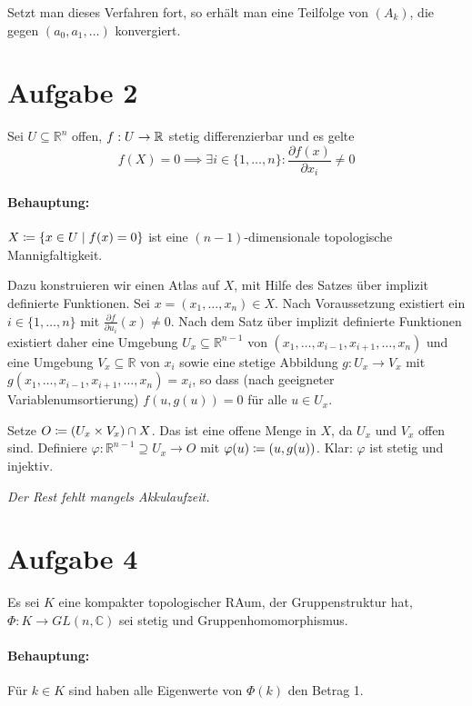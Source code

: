 \documentclass{article}
\begin{document}
Setzt man dieses Verfahren fort, so erhält man eine Teilfolge von $(A_k)$, die gegen $(a_0,a_1,\ldots)$ konvergiert.

\section*{Aufgabe 2}

Sei $U\subseteq \mathbb R^n$ offen, $f:U\to \mathbb{R}$ stetig differenzierbar und es gelte 
\[
f(X)= 0 \implies \exists i\in \{1,\ldots,n\}: \frac{\partial f(x)}{\partial x_i} \ne 0
\]

\paragraph{Behauptung:} $X\mathrel{\mbox{$\coloneqq$}} \{x\in U\mid f(x)=0\}$ ist eine $(n-1)$-dimensionale topologische Mannigfaltigkeit.

Dazu konstruieren wir einen Atlas auf $X$, mit Hilfe des Satzes über implizit definierte Funktionen. Sei $x=(x_1,\ldots,x_n)\in X$. Nach Voraussetzung existiert ein $i\in\{1,\ldots,n\}$ mit $\frac{\partial f}{\partial u_i}(x) \ne 0$. Nach dem Satz über implizit definierte Funktionen existiert daher eine Umgebung $U_x\subseteq \mathbb R^{n-1}$ von $(x_1,\ldots,x_{i-1},x_{i+1},\ldots,x_n)$ und eine Umgebung $V_x\subseteq \mathbb R$ von $x_i$ sowie eine stetige Abbildung $g:U_x\to V_x$ mit $g(x_1,\ldots,x_{i-1},x_{i+1},\ldots,x_n) = x_i$, so dass (nach geeigneter Variablenumsortierung) $f(u,g(u)) = 0$ für alle $u\in U_x$.

Setze $O\mathrel{\mbox{$\coloneqq$}} (U_x\times V_x)\cap X$. Das ist eine offene Menge in $X$, da $U_x$ und $V_x$ offen sind. Definiere $\varphi : \mathbb R^{n-1}\supseteq U_x \to O$ mit $\varphi(u) \mathrel{\mbox{$\coloneqq$}} (u,g(u))$. Klar: $\varphi$ ist stetig und injektiv.

\emph{Der Rest fehlt mangels Akkulaufzeit.}


\section*{Aufgabe 4}

Es sei $K$ eine kompakter topologischer RAum, der Gruppenstruktur hat, $\Phi: K\to GL(n,\mathbb C)$ sei stetig und Gruppenhomomorphismus.

\paragraph{Behauptung:} Für $k\in K$ sind haben alle Eigenwerte von $\Phi(k)$ den Betrag 1.
\end{document}
